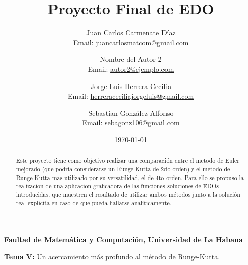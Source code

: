 \documentclass[a4paper,12pt]{article}
\title{Proyecto Final de EDO}
\author{
    Juan Carlos Carmenate Díaz \\
    Email: \href{mailto:juancarlosmatcom@gmail.com}{juancarlosmatcom@gmail.com}
    \and
    Nombre del Autor 2 \\
    Email: \href{mailto:autor2@ejemplo.com}{autor2@ejemplo.com}
    \and
    Jorge Luis Herrera Cecilia \\
    Email: \href{mailto:herreraceciliajorgeluis@gmail.com}{herreraceciliajorgeluis@gmail.com}
    \and
    Sebastian González Alfonso\\
    Email: \href{mailto:sebagon106z@gmail.com}{sebagonz106@gmail.com}
}
\date{\today}
\begin{document}
\maketitle

\begin{center}
\textbf{Faultad de Matemática y Computación, Universidad de La Habana}
\end{center}

\begin{center}
\textbf{Tema V:} Un acercamiento más profundo al método de Runge-Kutta.
\end{center}

\begin{abstract}
Este proyecto tiene como objetivo realizar una comparación entre el metodo de Euler mejorado (que podría considerarse un Runge-Kutta de 2do orden) y el metodo de Runge-Kutta mas utilizado por su versatilidad, el de 4to orden. Para ello se propuso la realizacion de una aplicacion graficadora de las funciones soluciones de EDOs introducidas, que muestren el resultado de utilizar ambos métodos junto a la solución real explicita en caso de que pueda hallarse analíticamente. 
\end{abstract}
\end{document}

